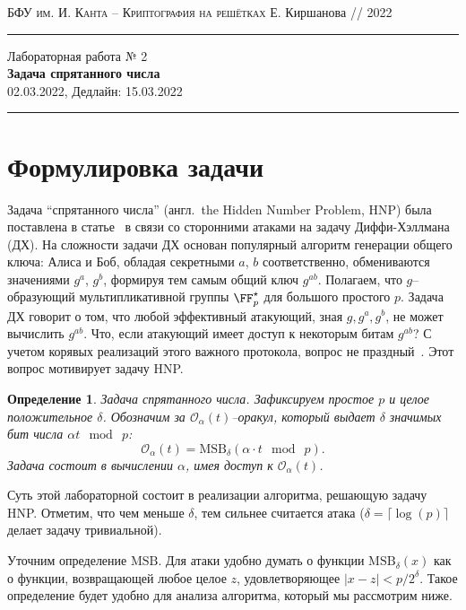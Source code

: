 \documentclass[11pt]{exam}
\newtheorem{definition}[theorem]{Определение}
\theoremstyle{definition}
\newcommand{\bigO}{\mathcal{O}}
\begin{document}
	{\noindent
		\textsc{БФУ им. И. Канта -- Криптография на решётках}
		\hfill {Е. Киршанова // 2022\\}
\hrule
\begin{center}
	{\LARGE
			Лабораторная работа № 2 \\[5pt]
			\textbf{
				Задача спрятанного числа 
			} \\[10pt]
	 	{02.03.2022, Дедлайн: 15.03.2022} 
 	} 
\end{center}
\hrule \vspace{5mm}
	
	\thispagestyle{empty}
	
	\vspace{0.2cm}
	\section{Формулировка задачи}
	Задача ``спрятанного числа'' (англ.\ the Hidden Number Problem, HNP) была поставлена в статье~\cite{BV} в связи со сторонними атаками на задачу Диффи-Хэллмана (ДХ). На сложности задачи ДХ основан популярный алгоритм генерации общего ключа: Алиса и Боб, обладая секретными $a$, $b$ соответственно, обмениваются значениями $g^a$, $g^b$, формируя тем самым общий ключ $g^{ab}$. Полагаем, что $g$–образующий мультипликативной группы $\FF_p^\star$ для большого простого $p$. Задача ДХ говорит о том, что любой эффективный атакующий, зная $g,g^a,g^b$, не может вычислить $g^{ab}$. Что, если атакующий имеет доступ к некоторым битам $g^{ab}$? С учетом корявых реализаций этого важного протокола, вопрос не праздный~\cite{MB+}. Этот вопрос мотивирует задачу HNP.
	\begin{definition}
	 Задача спрятанного числа. Зафиксируем простое $p$ и целое положительное $\delta$. Обозначим за $\bigO_\alpha(t)$–оракул, который выдает $\delta$ значимых бит числа $\alpha t~\bmod~p$:
	 \[
	 	\bigO_\alpha(t) = \mathrm{MSB}_{\delta}(\alpha \cdot t~\bmod~p).
	 \]
	Задача состоит в вычислении $\alpha$, имея доступ к $\bigO_\alpha(t)$.
	\end{definition}

	Суть этой лабораторной состоит в реализации алгоритма, решающую задачу HNP. Отметим, что чем меньше $\delta$, тем сильнее считается атака ($\delta = \lceil \log(p)\rceil$ делает задачу тривиальной).
	
	Уточним определение $\mathrm{MSB}$. Для атаки удобно думать о функции $\mathrm{MSB}_{\delta}(x)$ как о функции, возвращающей любое целое $z$, удовлетворяющее $|x-z| < p/2^\delta$. Такое определение будет удобно для анализа алгоритма, который мы рассмотрим ниже.
	
}
\end{document}
